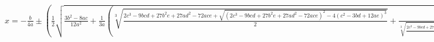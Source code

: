 \documentclass[preview]{standalone}
\begin{document}
\begin{center}
$x=-\frac{b}{4a}\pm\left(\frac{1}{2}\sqrt{\frac{3b^2-8ac}{12a^2}+\frac{1}{3a}\left(\sqrt[3]{\frac{2c^3-9bcd+27b^2e+27ad^2-72ace+\sqrt{\left(2c^3-9bcd+27b^2e+27ad^2-72ace\right)^2-4\left(c^2-3bd+12ae\right)^3}}{2}}+\frac{c^2-3bd+12ae}{\sqrt[3]{\frac{2c^3-9bcd+27b^2e+27ad^2-72ace+\sqrt{\left(2c^3-9bcd+27b^2e+27ad^2-72ace\right)^2-4\left(c^2-3bd+12ae\right)^3}}{2}}}\right)}\right)\pm\frac{1}{2}\sqrt{-4\left(\frac{1}{2}\sqrt{\frac{3b^2-8ac}{12a^2}+\frac{1}{3a}\left(\sqrt[3]{\frac{2c^3-9bcd+27b^2e+27ad^2-72ace+\sqrt{\left(2c^3-9bcd+27b^2e+27ad^2-72ace\right)^2-4\left(c^2-3bd+12ae\right)^3}}{2}}+\frac{c^2-3bd+12ae}{\sqrt[3]{\frac{2c^3-9bcd+27b^2e+27ad^2-72ace+\sqrt{\left(2c^3-9bcd+27b^2e+27ad^2-72ace\right)^2-4\left(c^2-3bd+12ae\right)^3}}{2}}}\right)}\right)^2-\frac{8ac-3b^2}{4a^2}+\frac{\frac{b^3-4abc+8a^2d}{8a^3}}{\frac{1}{2}\sqrt{\frac{3b^2-8ac}{12a^2}+\frac{1}{3a}\left(\sqrt[3]{\frac{2c^3-9bcd+27b^2e+27ad^2-72ace+\sqrt{\left(2c^3-9bcd+27b^2e+27ad^2-72ace\right)^2-4\left(c^2-3bd+12ae\right)^3}}{2}}+\frac{c^2-3bd+12ae}{\sqrt[3]{\frac{2c^3-9bcd+27b^2e+27ad^2-72ace+\sqrt{2c^3-9bcd+27b^2e+27ad^2-72ace^2-4\left(c^2-3bd+12ae\right)^3}}{2}}}\right)}}}$
\end{center}
\end{document}
